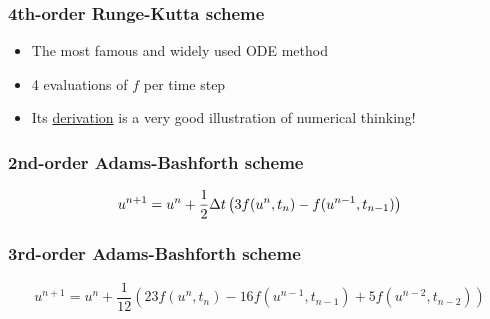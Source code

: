 \documentclass{beamer}
\begin{document}
\begin{frame}
\frametitle{4th-order Runge-Kutta scheme}

\label{decay:fd2:RK4}

\begin{itemize}
 \item The most famous and widely used ODE method

 \item 4 evaluations of $f$ per time step

 \item Its \href{{http://tinyurl.com/nclmcng/pub/sphinx-decay/._main_decay007.html#th-order-runge-kutta-scheme}}{derivation} is a very good illustration of numerical thinking!
\end{itemize}

\noindent
\end{frame}

\begin{frame}
\frametitle{2nd-order Adams-Bashforth scheme}


\begin{equation}
u^{n+1} = u^n + \half\Delta t\left( 3f(u^n, t_n) - f(u^{n-1}, t_{n-1})
\right)
\label{decay:fd2:AB2}
\end{equation}
\end{frame}

\begin{frame}
\frametitle{3rd-order Adams-Bashforth scheme}


\begin{equation}
u^{n+1} = u^n + \frac{1}{12}\left( 23f(u^n, t_n) - 16 f(u^{n-1},t_{n-1})
+ 5f(u^{n-2}, t_{n-2})\right)
\label{decay:fd2:AB3}
\end{equation}
\end{frame}
\end{document}
